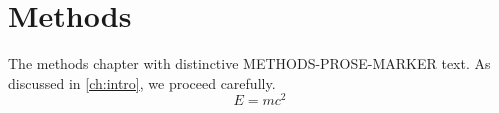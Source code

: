 \chapter{Methods}\label{ch:methods}
The methods chapter with distinctive METHODS-PROSE-MARKER text.
As discussed in \cref{ch:intro}, we proceed carefully.
\begin{equation}\label{eq:key}
E = m c^2
\end{equation}

